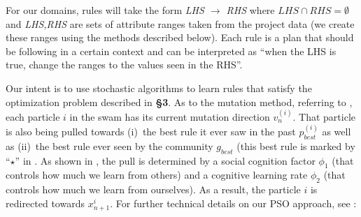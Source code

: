 For our domains,  rules will take the  form {\em LHS $\rightarrow$ RHS} where $\mathit{LHS} \cap \mathit{RHS}=\emptyset$
 and {\em LHS,RHS} are sets of attribute ranges taken from the project data (we create these ranges using
 the methods described below).
 Each rule is a plan that should be following in a certain context and can be interpreted
 as ``when the LHS is true, change the ranges to the values seen in the RHS''. 
 

 




Our intent is to use stochastic algorithms to learn rules that satisfy the optimization problem described in {\bf \S{3}}.
As to the mutation method, referring to ,
each particle $i$  in the swam has
its current mutation  direction
$v_n^{(i)}$. That particle is   also being pulled towards
(i)~the best rule it ever saw in the past $p_{\mathit{best}}^{(i)}$
as well as (ii)~the best rule ever seen by the community 
$g_{\mathit{best}}$ (this best rule is marked by ``{\LARGE $\star$}'' in . 
As shown in , the pull is determined by  a social cognition factor  $\phi_1$
(that controls how much we learn from others) and
 a cognitive learning rate $\phi_2$ (that controls how much we learn from ourselves).
As a result, the particle $i$ is redirected towards $x_{n+1}^{i}$. For further technical details on our PSO approach, see :

